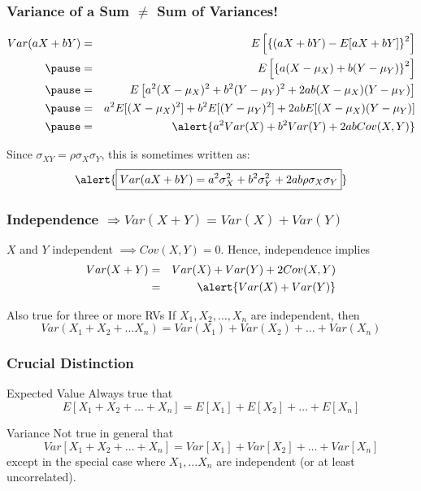 \begin{frame}
\frametitle{Variance of a Sum $\neq$ Sum of Variances!}
\footnotesize
\begin{eqnarray*}
	Var(aX + bY) &=& E\left[\left\{\left( aX + bY\right) - E[aX + bY]\right\}^2  \right]\\ \pause
	&=& E\left[  \left\{a (X - \mu_X) + b(Y - \mu_Y)\right\}^2 \right]\\ \pause
	&=& E\left[a^2(X-\mu_X)^2 + b^2(Y-\mu_Y)^2 + 2ab(X-\mu_X)(Y-\mu_Y)  \right]\\ \pause
	&=&a^2E[(X-\mu_X)^2] + b^2 E[(Y-\mu_Y)^2] + 2ab E[(X-\mu_X)(Y-\mu_Y)]\\ \pause
	&=& \alert{a^2 Var(X) + b^2 Var(Y) + 2ab Cov(X,Y)}
\end{eqnarray*}


\vspace{3em}
\normalsize
Since $\sigma_{XY} = \rho\sigma_X \sigma_Y$, this is sometimes written as:
$$\alert{\boxed{Var(aX + bY) = a^2 \sigma_X^2 + b^2 \sigma_Y^2 + 2ab \rho \sigma_X \sigma_Y}}$$
\end{frame}
\begin{frame}
\frametitle{Independence $\Rightarrow Var(X+Y) = Var(X) + Var(Y)$}

$X$ and $Y$ independent $\implies Cov(X,Y)=0$. Hence, independence implies
\begin{eqnarray*}
	Var(X + Y) &=& Var(X) + Var(Y) + 2 Cov(X,Y)\\
			&=& \alert{Var(X) +Var(Y)}
\end{eqnarray*}


\begin{block}{Also true for three or more RVs}
If $X_1, X_2, \hdots, X_n$ are independent, then
	$$Var(X_1 + X_2 + \hdots X_n) = Var(X_1) + Var(X_2) + \hdots + Var(X_n)$$
\end{block}

\end{frame}
\begin{frame}
\frametitle{Crucial Distinction}
\begin{block}{Expected Value}
\alert{Always} true that
	$$E[X_1 + X_2 + \hdots + X_n] = E[X_1] + E[X_2] + \hdots + E[X_n]$$
\end{block}


\begin{block}{Variance}
\alert{Not true in general} that 
	$$Var[X_1 + X_2 + \hdots + X_n] = Var[X_1] + Var[X_2] + \hdots + Var[X_n]$$
except in the special case where $X_1, \hdots X_n$ are independent (or at least uncorrelated).
\end{block}
\end{frame}


